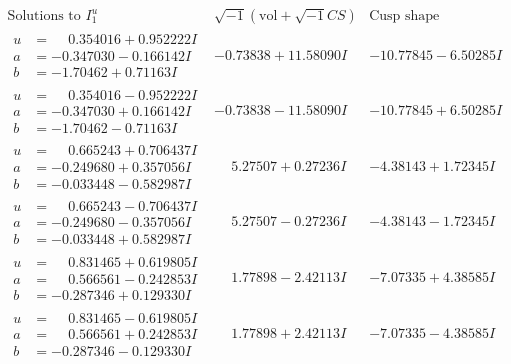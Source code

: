 \documentclass[1p]{elsarticle_modified}
\theoremstyle{definition}
\newcommand{\I}{\sqrt{-1}}
\begin{document}
$$\begin{array}{c|c|c}  
\text{Solutions to }I^u_{1}& \I (\text{vol} + \sqrt{-1}CS) & \text{Cusp shape}\\
 \hline 
\begin{aligned}
u &= \phantom{-}0.354016 + 0.952222 I \\
a &= -0.347030 - 0.166142 I \\
b &= -1.70462 + 0.71163 I\end{aligned}
 & -0.73838 + 11.58090 I & -10.77845 - 6.50285 I \\ \hline\begin{aligned}
u &= \phantom{-}0.354016 - 0.952222 I \\
a &= -0.347030 + 0.166142 I \\
b &= -1.70462 - 0.71163 I\end{aligned}
 & -0.73838 - 11.58090 I & -10.77845 + 6.50285 I \\ \hline\begin{aligned}
u &= \phantom{-}0.665243 + 0.706437 I \\
a &= -0.249680 + 0.357056 I \\
b &= -0.033448 - 0.582987 I\end{aligned}
 & \phantom{-}5.27507 + 0.27236 I & -4.38143 + 1.72345 I \\ \hline\begin{aligned}
u &= \phantom{-}0.665243 - 0.706437 I \\
a &= -0.249680 - 0.357056 I \\
b &= -0.033448 + 0.582987 I\end{aligned}
 & \phantom{-}5.27507 - 0.27236 I & -4.38143 - 1.72345 I \\ \hline\begin{aligned}
u &= \phantom{-}0.831465 + 0.619805 I \\
a &= \phantom{-}0.566561 - 0.242853 I \\
b &= -0.287346 + 0.129330 I\end{aligned}
 & \phantom{-}1.77898 - 2.42113 I & -7.07335 + 4.38585 I \\ \hline\begin{aligned}
u &= \phantom{-}0.831465 - 0.619805 I \\
a &= \phantom{-}0.566561 + 0.242853 I \\
b &= -0.287346 - 0.129330 I\end{aligned}
 & \phantom{-}1.77898 + 2.42113 I & -7.07335 - 4.38585 I \\ \hline\begin{aligned}

\end{aligned}
\end{array}$$
\end{document}
